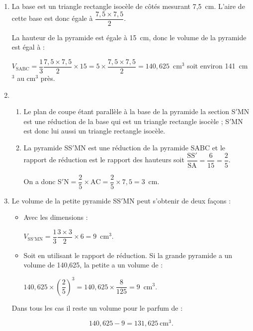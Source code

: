 \begin{enumerate}
\item La base est un triangle rectangle isocèle de côtés mesurant 7,5~cm. L'aire de cette base est donc égale à $\dfrac{7,5 \times 7,5}{2}$.

La hauteur de la pyramide est égale à 15~cm, donc le volume de la pyramide est égal à :

$V_{\text{SABC}} = \dfrac{1}{3} \dfrac{7,5 \times 7,5}{2}\times 15 = 5\times  \dfrac{7,5 \times 7,5}{2} = 140,625$~cm$^3$ soit environ 141~cm$^3$ au cm$^3$ près.
\item 
	\begin{enumerate}
		\item Le plan de coupe étant parallèle à la base de la pyramide la section S$'$MN est une réduction de la base qui est un triangle rectangle isocèle ; S$'$MN est donc lui aussi un triangle rectangle isocèle.
		\item La pyramide SS$'$MN est une réduction de la pyramide SABC et le rapport de réduction est le rapport des hauteurs soit $\dfrac{\text{SS}'}{\text{SA}} = \dfrac{6}{15} = \dfrac{2}{5}$.
		
On a donc S$'\text{N} = \dfrac{2}{5} \times \text{AC} = \dfrac{2}{5} \times 7,5 = 3$~cm.
	\end{enumerate}
\item Le volume de la petite pyramide SS$'$MN peut s'obtenir de deux façons :
\begin{itemize}
\item Avec les dimensions :

$V_{\text{SS}'\text{MN}} = \dfrac{1}{3} \dfrac{3 \times 3}{2}\times 6 = 9$~cm$^3$.
\item Soit en utilisant le rapport de réduction. Si la grande pyramide a un volume de 140,625, la petite a un volume de :

$140,625 \times \left(\dfrac{2}{5}\right)^3 = 140,625 \times \dfrac{8}{125} = 9$~cm$^3$.
\end{itemize}

Dans tous les cas il reste un volume pour le parfum de :

\[140,625 - 9 = 131,625~\text{cm}^3.\]
\end{enumerate}

\vspace{0.5cm}

